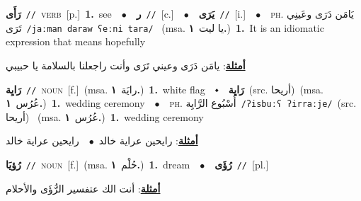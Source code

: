 \documentclass[10pt,a4paper,twoside]{article} %
\begin{document}
\begin{multicols}{2}
{\setlength\topsep{0pt}\textbf{\foreignlanguage{arabic}{رَأَى}}\ {\color{gray}\texttt{//}\color{black}}\ \textsc{verb}\ [p.]\ \textbf{1.}~see\ \ $\bullet$\ \ \setlength\topsep{0pt}\textbf{\foreignlanguage{arabic}{ر}}\ {\color{gray}\texttt{//}\color{black}}\ [c.]\ \ $\bullet$\ \ \setlength\topsep{0pt}\textbf{\foreignlanguage{arabic}{يَرَى}}\ {\color{gray}\texttt{//}\color{black}}\ [i.]\ \ $\bullet$\ \ \textsc{ph.} \color{gray} \foreignlanguage{arabic}{يَامَن دَرَى وعَينِي تَرَى}\color{black}\ {\color{gray}\texttt{/{\sffamily jaːman daraw ʕeːni tara}/}\color{black}}\ \color{gray} (msa. \foreignlanguage{arabic}{يا ليت}~\foreignlanguage{arabic}{\textbf{١.}})\color{black}\ \textbf{1.}~It is an idiomatic expression that means hopefully\  \begin{flushright}\color{gray}\foreignlanguage{arabic}{\textbf{\underline{\foreignlanguage{arabic}{أمثلة}}}: يامَن دَرَى وعيني تَرَى وأنت راجعلنا بالسلامة يا حبيبي}\end{flushright}\color{black}} \vspace{2mm}

{\setlength\topsep{0pt}\textbf{\foreignlanguage{arabic}{رَايِة}}\ {\color{gray}\texttt{//}\color{black}}\ \textsc{noun}\ [f.]\ \color{gray}(msa. \foreignlanguage{arabic}{رايَة}~\foreignlanguage{arabic}{\textbf{١.}})\color{black}\ \textbf{1.}~white flag\ \ $\smblkdiamond$\ \ \setlength\topsep{0pt}\textbf{\foreignlanguage{arabic}{رَايِة}}\ (src. \color{gray}\foreignlanguage{arabic}{أريحا}\color{black})\ \color{gray}(msa. \foreignlanguage{arabic}{عُرُس}~\foreignlanguage{arabic}{\textbf{١.}})\color{black}\ \textbf{1.}~wedding ceremony\ \ $\bullet$\ \ \textsc{ph.} \color{gray} \foreignlanguage{arabic}{أُسْبُوع الرَّايِة}\color{black}\ {\color{gray}\texttt{/{\sffamily ʔisbuːʕ ʔirraːje}/}\color{black}}\ \color{gray}(src. \foreignlanguage{arabic}{أريحا})\color{black}\ \color{gray} (msa. \foreignlanguage{arabic}{عُرُس}~\foreignlanguage{arabic}{\textbf{١.}})\color{black}\ \textbf{1.}~wedding ceremony\  \begin{flushright}\color{gray}\foreignlanguage{arabic}{\textbf{\underline{\foreignlanguage{arabic}{أمثلة}}}: رايحين عراية خالد\ $\bullet$\ \  رايحين عراية خالد}\end{flushright}\color{black}} \vspace{2mm}

{\setlength\topsep{0pt}\textbf{\foreignlanguage{arabic}{رُؤيَا}}\ {\color{gray}\texttt{//}\color{black}}\ \textsc{noun}\ [f.]\ \color{gray}(msa. \foreignlanguage{arabic}{حُلْم}~\foreignlanguage{arabic}{\textbf{١.}})\color{black}\ \textbf{1.}~dream\ \ $\bullet$\ \ \setlength\topsep{0pt}\textbf{\foreignlanguage{arabic}{رُؤَى}}\ {\color{gray}\texttt{//}\color{black}}\ [pl.]\  \begin{flushright}\color{gray}\foreignlanguage{arabic}{\textbf{\underline{\foreignlanguage{arabic}{أمثلة}}}: أنت الك عتفسير الرُّؤَى والأحلام}\end{flushright}\color{black}} \vspace{2mm}


\end{multicols}
\end{document}
